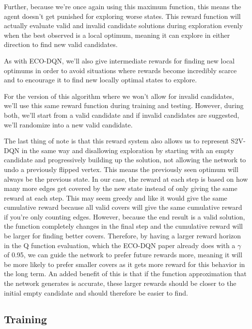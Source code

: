 \documentclass{article}
\begin{document}
Further, because we're once again using this maximum function, this means the agent doesn't get punished for exploring worse states. This reward function will actually evaluate valid and invalid candidate solutions during exploration evenly when the best observed is a local optimum, meaning it can explore in either direction to find new valid candidates. 

As with ECO-DQN, we'll also give intermediate rewards for finding new local optimums in order to avoid situations where rewards become incredibly scarce and to encourage it to find new locally optimal states to explore. 

For the version of this algorithm where we won't allow for invalid candidates, we'll use this same reward function during training and testing. However, during both, we'll start from a valid candidate and if invalid candidates are suggested, we'll randomize into a new valid candidate. 

The last thing of note is that this reward system also allows us to represent S2V-DQN in the same way and disallowing exploration by starting with an empty candidate and progressively building up the solution, not allowing the network to undo a previously flipped vertex. This means the previously seen optimum will always be the previous state. In our case, the reward at each step is based on how many more edges get covered by the new state instead of only giving the same reward at each step. This may seem greedy and like it would give the same cumulative reward because all valid covers will give the same cumulative reward if you're only counting edges. However, because the end result is a valid solution, the function completely changes in the final step and the cumulative reward will be larger for finding better covers. Therefore, by having a larger reward horizon in the Q function evaluation, which the ECO-DQN paper already does with a $\gamma$ of 0.95, we can guide the network to prefer future rewards more, meaning it will be more likely to prefer smaller covers as it gets more reward for this behavior in the long term. An added benefit of this is that if the function approximation that the network generates is accurate, these larger rewards should be closer to the initial empty candidate and should therefore be easier to find. 

\subsection{Training}
\end{document}

